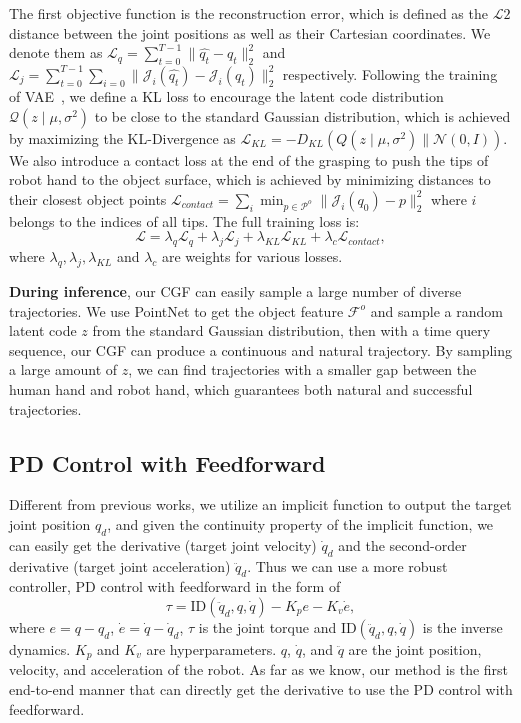 \documentclass[letterpaper, 10 pt, journal, twoside]{IEEEtran}
\begin{document}
The first objective function is the reconstruction error, which is defined as the $\mathcal{L}2$ distance between the joint positions as well as their Cartesian coordinates. We denote them as $\mathcal{L}_q =\sum_{t=0}^{T-1} \|\hat{q_t}-q_t\|_{2}^{2}$ and $\mathcal{L}_j = \sum_{t=0}^{T-1} \sum_{i=0} \|\mathcal{J}_i(\hat{q_t}) - \mathcal{J}_i(q_t)\|_{2}^{2}$ respectively. Following the training of VAE~\cite{Andrews2013}, we define a KL loss to encourage the latent code distribution $\mathcal{Q}\left(z \mid \mu, \sigma^{2}\right)$ to be close to the standard Gaussian distribution, which is achieved by maximizing the KL-Divergence as $\mathcal{L}_{KL} = -D_{KL}\left(Q\left(z \mid \mu, \sigma^{2}\right)\| \mathcal{N}(0, I)\right)$. We also introduce a contact loss at the end of the grasping to push the tips of robot hand to the object surface, which is achieved by minimizing distances to their closest object points $\mathcal{L}_{contact} = \sum_{i} \min_{p \in \mathcal{P}^{o}} \| \mathcal{J}_i(q_0) - p  \|^2_2$ where $i$ belongs to the indices of all tips. The full training loss is:
\begin{equation}
    \mathcal{L} = \lambda_q \mathcal{L}_q + \lambda_j \mathcal{L}_j + \lambda_{KL} \mathcal{L}_{KL} + \lambda_{c} \mathcal{L}_{contact},
\end{equation}
where $\lambda_q, \lambda_j, \lambda_{KL}$ and $\lambda_c$ are weights for various losses.

\textbf{During inference}, our CGF can easily sample a large number of diverse trajectories. We use PointNet to get the object feature $\mathcal{F}^o$ and sample a random latent code $z$ from the standard Gaussian distribution, then with a time query sequence, our CGF can produce a continuous and natural trajectory. By sampling a large amount of $z$, we can find trajectories with a smaller gap between the human hand and robot hand, which guarantees both natural and successful trajectories.

\vspace{-0.05in}
\subsection{PD Control with Feedforward}
\label{sec:pd-control}
Different from previous works, we utilize an implicit function to output the target joint position $q_d$, and given the continuity property of the implicit function, we can easily get the derivative (target joint velocity) $\dot{q}_d$ and the second-order derivative (target joint acceleration) $\ddot{q}_d$. Thus we can use a more robust controller, PD control with feedforward in the form of
\begin{equation}
    \tau = \text{ID}(\ddot{q}_d, q, \dot{q})-K_pe-K_v\dot{e},
\end{equation}
where $e=q-q_d$, $\dot{e}=\dot{q}-\dot{q}_d$, $\tau$ is the joint torque and $\text{ID}(\ddot{q}_d, q, \dot{q})$ is the inverse dynamics. $K_p$ and $K_v$ are hyperparameters. $q$, $\dot{q}$, and $\ddot{q}$ are the joint position, velocity, and acceleration of the robot. As far as we know, our method is the first end-to-end manner that can directly get the derivative to use the PD control with feedforward.
\end{document}
